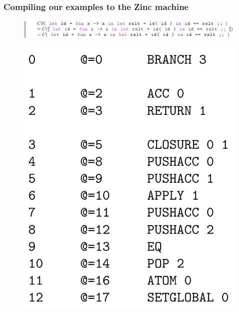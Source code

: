 \documentclass{beamer}
\begin{document}
  \begin{frame}
    \frametitle{Compiling our examples to the Zinc machine}
    \begin{figure}[ht]
      \begin{center}        
        \includegraphics[width=\textwidth,height=0.15\textheight,keepaspectratio]{pipelinefigures/CompilerPathwayCoreLanguageAbstractionApplication.pdf}
      \end{center}      
    \end{figure}        
    \begin{figure}[ht]
      \begin{center}        
        \includegraphics[width=\textwidth,height=0.52\textheight,keepaspectratio]{pipelinefigures/CompilerPathwayCoreLanguageAbsAppByteCode.pdf}
      \end{center}      
    \end{figure}        
  \end{frame}
\end{document}
